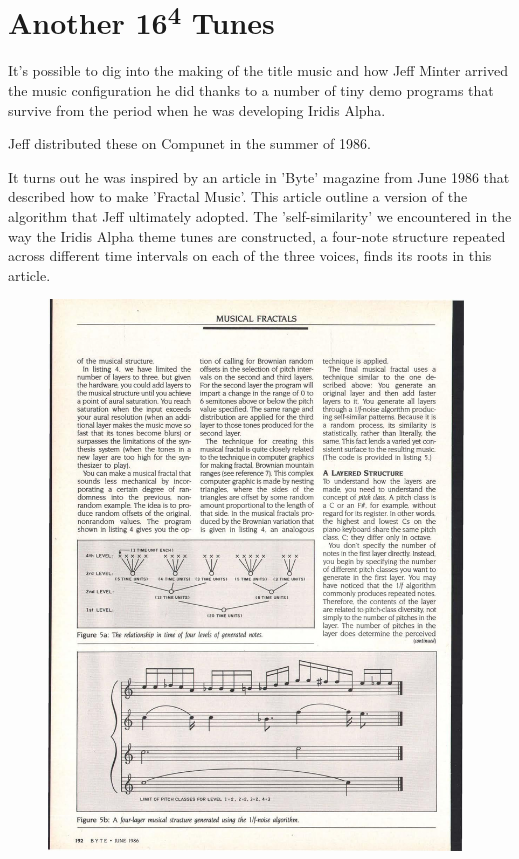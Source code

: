 \chapter{Another 16\textsuperscript{4} Tunes} 

It's possible to dig into the making of the title music and how Jeff Minter
arrived the music configuration he did thanks to a number of tiny demo programs that
survive from the period when he was developing Iridis Alpha.

Jeff distributed these on Compunet in the summer of 1986.

It turns out he was inspired by an article in 'Byte' magazine from June 1986 that
described how to make 'Fractal Music'. This article outline a version of the
algorithm that Jeff ultimately adopted. The 'self-similarity' we encountered
in the way the Iridis Alpha theme tunes are constructed, a four-note structure
repeated across different time intervals on each of the three voices, finds its
roots in this article.


\begin{figure}[H]
{
  \begin{adjustbox}{width=11cm,center}
  \includegraphics[width=11cm]{torus/fractal.jpg}%
    \end{adjustbox}
}\caption[]{}
\end{figure}


